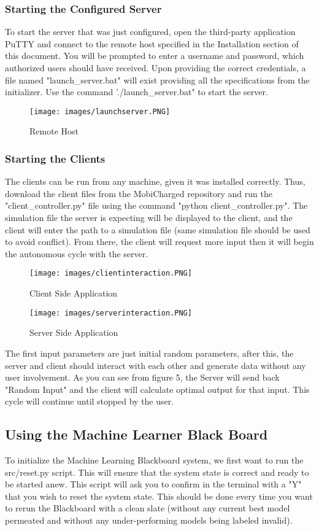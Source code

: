 \documentclass[12pt, titlepage]{article}
\begin{document}
\subsubsection{Starting the Configured Server}
To start the server that was just configured, open the third-party application PuTTY and connect to the remote host specified in the Installation section of this document. You will be prompted to enter a username and password, which authorized users should have received. Upon providing the correct credentials, a file named "launch\_server.bat" will exist providing all the specifications from the initializer. Use the command './launch\_server.bat" to start the server.
\begin{figure}[H]
    \centering
    \texttt{[image: images/launchserver.PNG]}
    \caption{Remote Host}
    \label{fig:my_label3}
\end{figure}

\subsubsection{Starting the Clients}
The clients can be run from any machine, given it was installed correctly. Thus, download the client files from the MobiCharged repository and run the "client\_controller.py" file using the command "python client\_controller.py". The simulation file the server is expecting will be displayed to the client, and the client will enter the path to a simulation file (same simulation file should be used to avoid conflict). From there, the client will request more input then it will begin the autonomous cycle with the server. 
\begin{figure}[H]
    \centering
    \texttt{[image: images/clientinteraction.PNG]}
    \caption{Client Side Application}
    \label{fig:my_label4}
\end{figure}
\begin{figure}[H]
    \centering
    \texttt{[image: images/serverinteraction.PNG]}
    \caption{Server Side Application}
    \label{fig:my_label5}
\end{figure}
The first input parameters are just initial random parameters, after this, the server and client should interact with each other and generate data without any user involvement. As you can see from figure 5, the Server will send back "Random Input" and the client will calculate optimal output for that input. This cycle will continue until stopped by the user.

\subsection{Using the Machine Learner Black Board}
To initialize the Machine Learning Blackboard system, we first want to run the src/reset.py script. This will ensure that the system state is correct and ready to be started anew. This script will ask you to confirm in the terminal with a "Y" that you wish to reset the system state. This should be done every time you want to rerun the Blackboard with a clean slate (without any current best model permeated and without any under-performing models being labeled invalid). 
\end{document}
